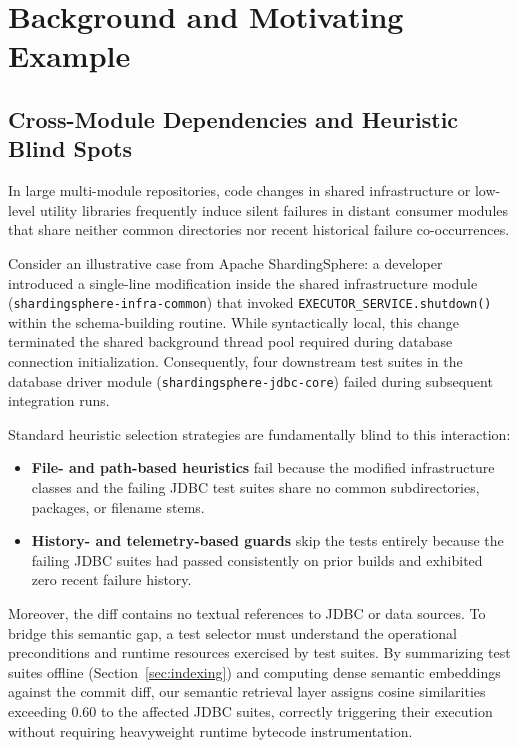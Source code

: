 \section{Background and Motivating Example}
\label{sec:background}

\subsection{Cross-Module Dependencies and Heuristic Blind Spots}
\label{sec:motivating}

In large multi-module repositories, code changes in shared infrastructure or low-level utility libraries frequently induce silent failures in distant consumer modules that share neither common directories nor recent historical failure co-occurrences. 

Consider an illustrative case from Apache ShardingSphere: a developer introduced a single-line modification inside the shared infrastructure module (\texttt{shardingsphere-infra-common}) that invoked \texttt{EXECUTOR\_SERVICE.shutdown()} within the schema-building routine. While syntactically local, this change terminated the shared background thread pool required during database connection initialization. Consequently, four downstream test suites in the database driver module (\texttt{shardingsphere-jdbc-core}) failed during subsequent integration runs.

Standard heuristic selection strategies are fundamentally blind to this interaction:
\begin{itemize}
    \item \textbf{File- and path-based heuristics} fail because the modified infrastructure classes and the failing JDBC test suites share no common subdirectories, packages, or filename stems.
    \item \textbf{History- and telemetry-based guards} skip the tests entirely because the failing JDBC suites had passed consistently on prior builds and exhibited zero recent failure history.
\end{itemize}
Moreover, the diff contains no textual references to JDBC or data sources. To bridge this semantic gap, a test selector must understand the operational preconditions and runtime resources exercised by test suites. By summarizing test suites offline (Section~\ref{sec:indexing}) and computing dense semantic embeddings against the commit diff, our semantic retrieval layer assigns cosine similarities exceeding 0.60 to the affected JDBC suites, correctly triggering their execution without requiring heavyweight runtime bytecode instrumentation.

